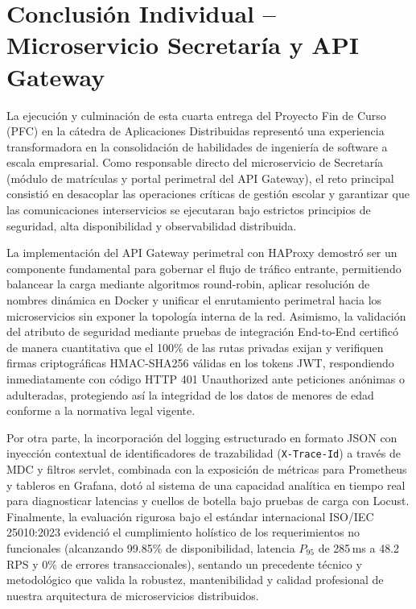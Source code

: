 \documentclass[11pt,a4paper]{article}
\begin{document}
\section{Conclusi\'on Individual -- Microservicio Secretar\'ia y API Gateway}

La ejecuci\'on y culminaci\'on de esta cuarta entrega del Proyecto Fin de Curso (PFC) en la c\'atedra de Aplicaciones Distribuidas represent\'o una experiencia transformadora en la consolidaci\'on de habilidades de ingenier\'ia de software a escala empresarial. Como responsable directo del microservicio de Secretar\'ia (m\'odulo de matr\'iculas y portal perimetral del API Gateway), el reto principal consisti\'o en desacoplar las operaciones cr\'iticas de gesti\'on escolar y garantizar que las comunicaciones interservicios se ejecutaran bajo estrictos principios de seguridad, alta disponibilidad y observabilidad distribuida.

La implementaci\'on del API Gateway perimetral con HAProxy demostr\'o ser un componente fundamental para gobernar el flujo de tr\'afico entrante, permitiendo balancear la carga mediante algoritmos round-robin, aplicar resoluci\'on de nombres din\'amica en Docker y unificar el enrutamiento perimetral hacia los microservicios sin exponer la topolog\'ia interna de la red. Asimismo, la validaci\'on del atributo de seguridad mediante pruebas de integraci\'on End-to-End certific\'o de manera cuantitativa que el 100\% de las rutas privadas exijan y verifiquen firmas criptogr\'aficas HMAC-SHA256 v\'alidas en los tokens JWT, respondiendo inmediatamente con c\'odigo HTTP 401 Unauthorized ante peticiones an\'onimas o adulteradas, protegiendo as\'i la integridad de los datos de menores de edad conforme a la normativa legal vigente.

Por otra parte, la incorporaci\'on del logging estructurado en formato JSON con inyecci\'on contextual de identificadores de trazabilidad (\texttt{X-Trace-Id}) a trav\'es de MDC y filtros servlet, combinada con la exposici\'on de m\'etricas para Prometheus y tableros en Grafana, dot\'o al sistema de una capacidad anal\'itica en tiempo real para diagnosticar latencias y cuellos de botella bajo pruebas de carga con Locust. Finalmente, la evaluaci\'on rigurosa bajo el est\'andar internacional ISO/IEC 25010:2023 evidenci\'o el cumplimiento hol\'istico de los requerimientos no funcionales (alcanzando 99.85\% de disponibilidad, latencia $P_{95}$ de 285\,ms a 48.2 RPS y 0\% de errores transaccionales), sentando un precedente t\'ecnico y metodol\'ogico que valida la robustez, mantenibilidad y calidad profesional de nuestra arquitectura de microservicios distribuidos.

\newpage


\end{document}
